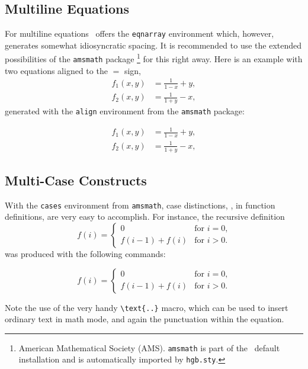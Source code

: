 \subsection{Multiline Equations}

For multiline equations \latex\ offers the \verb!eqnarray! environment which, however,
generates somewhat idiosyncratic spacing. It is recommended to use the extended
possibilities of the \texttt{amsmath} package%
\footnote{American Mathematical Society (AMS). \texttt{amsmath} is part of the 
\latex\ default installation and is automatically imported by \texttt{hgb.sty}.}
for this right away. Here is an example with two equations aligned to the $=$ sign,
%
\begin{align}
	f_1 (x,y) &= \frac{1}{1-x} + y , \label{eq:f1} \\
	f_2 (x,y) &= \frac{1}{1+y} - x , \label{eq:f2}
\end{align}
%
generated with the \texttt{align} environment from the \texttt{amsmath} package:
%
\begin{LaTeXCode}[numbers=none]
\begin{align}
  f_1 (x,y) &= \frac{1}{1-x} + y , \label{eq:f1} \\
  f_2 (x,y) &= \frac{1}{1+y} - x , \label{eq:f2}
\end{align}
\end{LaTeXCode}


\subsection{Multi-Case Constructs}

With the \texttt{cases} environment from \texttt{amsmath}, case distinctions, 
\eg, in function definitions, are very easy to accomplish.
For instance, the recursive definition
%
\begin{equation}
	f(i) =
	\begin{cases}
		0             & \text{for $i = 0$,}\\
		f(i-1) + f(i) & \text{for $i > 0$.}
	\end{cases}
\end{equation}%
%
was produced with the following commands:
%
\begin{LaTeXCode}[numbers=none]
\begin{equation}
	f(i) =
	\begin{cases}
	  0             & \text{for $i = 0$,}\\
	  f(i-1) + f(i) & \text{for $i > 0$.}
	\end{cases}
\end{equation}
\end{LaTeXCode}
%
Note the use of the very handy \verb!\text{..}! macro, which can be used
to insert ordinary text in math mode, and again the punctuation within the
equation.


